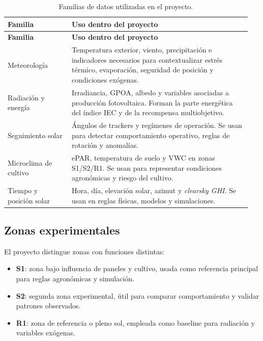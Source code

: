 ﻿\documentclass[11pt,a4paper]{article}
\begin{document}
\begin{longtable}{p{0.25\linewidth}p{0.70\linewidth}}
\caption{Familias de datos utilizadas en el proyecto.}\\
\toprule
\textbf{Familia} & \textbf{Uso dentro del proyecto} \\
\midrule
\endfirsthead
\toprule
\textbf{Familia} & \textbf{Uso dentro del proyecto} \\
\midrule
\endhead
Meteorología & Temperatura exterior, viento, precipitación e indicadores necesarios para contextualizar estrés térmico, evaporación, seguridad de posición y condiciones exógenas. \\ \addlinespace
Radiación y energía & Irradiancia, GPOA, albedo y variables asociadas a producción fotovoltaica. Forman la parte energética del índice IEC y de la recompensa multiobjetivo. \\ \addlinespace
Seguimiento solar & Ángulos de trackers y regímenes de operación. Se usan para detectar comportamiento operativo, reglas de rotación y anomalías. \\ \addlinespace
Microclima de cultivo & ePAR, temperatura de suelo y VWC en zonas S1/S2/R1. Se usan para representar condiciones agronómicas y riesgo del cultivo. \\ \addlinespace
Tiempo y posición solar & Hora, día, elevación solar, azimut y \emph{clearsky GHI}. Se usan en reglas físicas, modelos y simulaciones. \\
\bottomrule
\end{longtable}

\subsection{Zonas experimentales}

El proyecto distingue zonas con funciones distintas:

\begin{itemize}
    \item \textbf{S1}: zona bajo influencia de paneles y cultivo, usada como referencia principal para reglas agronómicas y simulación.
    \item \textbf{S2}: segunda zona experimental, útil para comparar comportamiento y validar patrones observados.
    \item \textbf{R1}: zona de referencia o pleno sol, empleada como baseline para radiación y variables exógenas.
\end{itemize}
\end{document}
